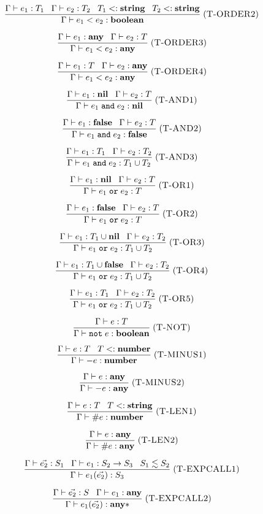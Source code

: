 \documentclass[12pt]{article}
\newcommand{\Any}{\mathbf{any}}
\newcommand{\Nil}{\mathbf{nil}}
\newcommand{\False}{\mathbf{false}}
\newcommand{\Boolean}{\mathbf{boolean}}
\newcommand{\Number}{\mathbf{number}}
\newcommand{\String}{\mathbf{string}}
\newcommand{\kw}[1]{\mathbf{\texttt{#1}}}
\newcommand{\mylabel}[1]{\; (\textsc{#1})}
\newcommand{\subtype}{<:}
\newcommand{\env}{\Gamma}
\begin{document}
\[
\frac{\env \vdash e_{1}:T_{1} \;\;\;
      \env \vdash e_{2}:T_{2} \;\;\;
      T_{1} \subtype \String \;\;\;
      T_{2} \subtype \String}
     {\env \vdash e_{1} < e_{2} : \Boolean}
\mylabel{T-ORDER2}
\]

\[
\frac{\env \vdash e_{1}:\Any \;\;\;
      \env \vdash e_{2}:T}
     {\env \vdash e_{1} < e_{2} : \Any}
\mylabel{T-ORDER3}
\]

\[
\frac{\env \vdash e_{1}:T \;\;\;
      \env \vdash e_{2}:\Any}
     {\env \vdash e_{1} < e_{2} : \Any}
\mylabel{T-ORDER4}
\]

\[
\frac{\env \vdash e_{1}:\Nil \;\;\;
      \env \vdash e_{2}:T}
     {\env \vdash e_{1} \; \kw{and} \; e_{2} : \Nil}
\mylabel{T-AND1}
\]

\[
\frac{\env \vdash e_{1}:\False \;\;\;
      \env \vdash e_{2}:T}
     {\env \vdash e_{1} \; \kw{and} \; e_{2} : \False}
\mylabel{T-AND2}
\]

\[
\frac{\env \vdash e_{1}:T_{1} \;\;\;
      \env \vdash e_{2}:T_{2}}
     {\env \vdash e_{1} \; \kw{and} \; e_{2} : T_{1} \cup T_{2}}
\mylabel{T-AND3}
\]

\[
\frac{\env \vdash e_{1}:\Nil \;\;\;
      \env \vdash e_{2}:T}
     {\env \vdash e_{1} \; \kw{or} \; e_{2} : T}
\mylabel{T-OR1}
\]

\[
\frac{\env \vdash e_{1}:\False \;\;\;
      \env \vdash e_{2}:T}
     {\env \vdash e_{1} \; \kw{or} \; e_{2} : T}
\mylabel{T-OR2}
\]

\[
\frac{\env \vdash e_{1}:T_{1} \cup \Nil \;\;\;
      \env \vdash e_{2}:T_{2}}
     {\env \vdash e_{1} \; \kw{or} \; e_{2} : T_{1} \cup T_{2}}
\mylabel{T-OR3}
\]

\[
\frac{\env \vdash e_{1}:T_{1} \cup \False \;\;\;
      \env \vdash e_{2}:T_{2}}
     {\env \vdash e_{1} \; \kw{or} \; e_{2} : T_{1} \cup T_{2}}
\mylabel{T-OR4}
\]

\[
\frac{\env \vdash e_{1}:T_{1} \;\;\;
      \env \vdash e_{2}:T_{2}}
     {\env \vdash e_{1} \; \kw{or} \; e_{2} : T_{1} \cup T_{2}}
\mylabel{T-OR5}
\]

\[
\frac{\env \vdash e:T}
     {\env \vdash \kw{not} \; e : \Boolean}
\mylabel{T-NOT}
\]

\[
\frac{\env \vdash e:T \;\;\;
      T \subtype \Number}
     {\env \vdash - e : \Number}
\mylabel{T-MINUS1}
\]

\[
\frac{\env \vdash e:\Any}
     {\env \vdash - e : \Any}
\mylabel{T-MINUS2}
\]

\[
\frac{\env \vdash e:T \;\;\;
      T \subtype \String}
     {\env \vdash \# e : \Number}
\mylabel{T-LEN1}
\]

\[
\frac{\env \vdash e:\Any}
     {\env \vdash \# e : \Any}
\mylabel{T-LEN2}
\]

\[
\frac{\env \vdash \vec{e_{2}}:S_{1} \;\;\;
      \env \vdash e_{1}:S_{2} \rightarrow S_{3} \;\;\;
      S_{1} \lesssim S_{2}}
     {\env \vdash e_{1}(\vec{e_{2}}) : S_{3}}
\mylabel{T-EXPCALL1}
\]

\[
\frac{\env \vdash \vec{e_{2}}:S \;\;\;
      \env \vdash e_{1}:\Any}
     {\env \vdash e_{1}(\vec{e_{2}}) : \Any{*}}
\mylabel{T-EXPCALL2}
\]
\end{document}
